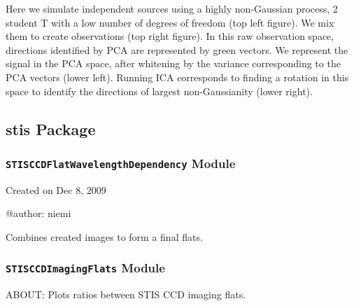 \documentclass[letterpaper,10pt,english]{sphinxmanual}
\begin{document}
Here we simulate independent sources using a highly non-Gaussian
process, 2 student T with a low number of degrees of freedom (top left
figure). We mix them to create observations (top right figure).
In this raw observation space, directions identified by PCA are
represented by green vectors. We represent the signal in the PCA space,
after whitening by the variance corresponding to the PCA vectors (lower
left). Running ICA corresponds to finding a rotation in this space to
identify the directions of largest non-Gaussianity (lower right).


\subsection{stis Package}
\label{SamPy.stis:stis-package}\label{SamPy.stis::doc}

\subsubsection{\texttt{STISCCDFlatWavelengthDependency} Module}
\label{SamPy.stis:module-SamPy.stis.STISCCDFlatWavelengthDependency}\label{SamPy.stis:stisccdflatwavelengthdependency-module}
Created on Dec 8, 2009

@author: niemi


\begin{fulllineitems}
\label{SamPy.stis:SamPy.stis.STISCCDFlatWavelengthDependency.CombineFlat}
Combines created images to form a final flats.

\end{fulllineitems}



\begin{fulllineitems}
\label{SamPy.stis:SamPy.stis.STISCCDFlatWavelengthDependency.RMS}
\end{fulllineitems}



\subsubsection{\texttt{STISCCDImagingFlats} Module}
\label{SamPy.stis:stisccdimagingflats-module}\label{SamPy.stis:module-SamPy.stis.STISCCDImagingFlats}
ABOUT:
Plots ratios between STIS CCD imaging flats.
\end{document}
